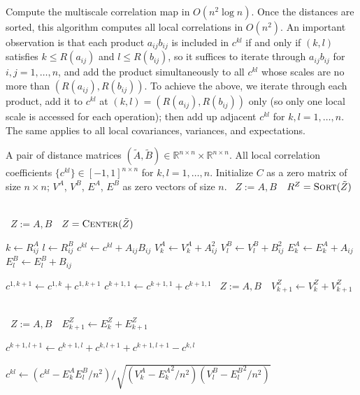 \documentclass[11pt]{article}
\newcommand{\Real}{\mathbb{R}}
\newcommand{\G}{c}
\newcommand{\Linefor}[2]{%
    \State \algorithmicfor\ {#1}\ \algorithmicdo\ {#2} \algorithmicend\ \algorithmicfor%
}
\newcommand{\rto}{\leftarrow}
\begin{document}
\begin{algorithm}
\caption{Compute the multiscale correlation map in $O(n^2 \log n)$. Once the distances are sorted, this algorithm computes all local correlations in $O(n^2)$. An important observation is that each product $a_{ij}b_{ij}$ is included in $\G^{kl}$ if and only if $(k,l)$ satisfies $k\leq R(a_{ij})$ and $l\leq R(b_{ij})$, so it suffices to iterate through $a_{ij}b_{ij}$ for $i,j=1,\ldots,n$, and add the product simultaneously to all $\G^{kl}$ whose scales are no more than $(R(a_{ij}),R(b_{ij}))$. To achieve the above, we iterate through each product, add it to $\G^{kl}$ at $(k,l)=(R(a_{ij}),R(b_{ij}))$ only (so only one local scale is accessed for each operation); then add up adjacent $\G^{kl}$ for $k,l=1,\ldots,n$. The same applies to all local covariances, variances, and expectations.} 
\label{alg:all_scales}
\begin{algorithmic}[1]
\Require A pair of distance matrices $(\tilde{A},\tilde{B}) \in \Real^{n \times n} \times \Real^{n \times n}$.
\Ensure All local correlation coefficients $\{\G^{kl}\} \in [-1,1]^{n \times n}$ for $k,l=1,\ldots,n$.
\State Initialize $C$ as a zero matrix of size $n \times n$; $V^{A}$, $V^{B}$, $E^{A}$, $E^{B}$ as zero vectors of size $n$.
\Linefor{$Z:=A,B$}{$R^{Z}=\textsc{Sort}(\tilde{Z})$}
\Linefor{$Z:=A,B$}{$Z=\textsc{Center}(\tilde{Z})$}

  
\State $k \rto R^{A}_{ij}$
\State $l \rto R^{B}_{ij}$
\State $\G^{kl} \rto \G^{kl}+A_{ij}B_{ij}$
\State $V^{A}_{k} \rto V^{A}_{k}+A_{ij}^2$
\State $V^{B}_{l} \rto V^{B}_{l}+B_{ij}^2$
\State $E^{A}_{k} \rto E^{A}_{k}+A_{ij}$
\State $E^{B}_{l} \rto E^{B}_{l}+B_{ij}$
\EndFor

  
\State $\G^{1, k+1} \rto \G^{1, k}+\G^{1, k+1}$
\State $\G^{k+1,1} \rto \G^{k+1,1}+\G^{k+1,1}$
\Linefor{$Z:=A,B$}{$V^{Z}_{k+1} \rto V^{Z}_{k}+V^{Z}_{k+1}$}
\Linefor{$Z:=A,B$}{$E^{Z}_{k+1} \rto E^{Z}_{k}+E^{Z}_{k+1}$}
\EndFor

\State $\G^{k+1,l+1} \rto \G^{k+1,l}+\G^{k,l+1}+\G^{k+1,l+1}-\G^{k,l}$
\EndFor

\State $\G^{kl} \rto \left(\G^{kl}-E^{A}_{k}E^{B}_{l}/n^2\right)/\sqrt{\left(V^{A}_{k}-{E^{A}_{k}}^2/n^2\right) \left(V^{B}_{l}-{E^{B}_{l}}^2/n^2\right)}$
\EndFor
\EndFunction
\end{algorithmic}
\end{algorithm}
\end{document}
